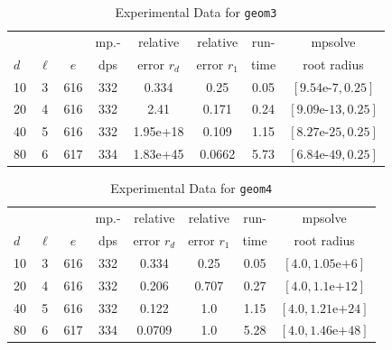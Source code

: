 \documentclass[runningheads]{llncs}
\begin{document}
\begin{table}
\caption{Experimental Data for \texttt{geom3}} %
\label{tab:geom3}
\vskip -0.15in
\begin{center}
\begin{small}
\begin{sc}
\begin{tabular}{lccccccc}
\toprule
&  &  & mp.-& relative  & relative & run- & mpsolve \\
$d$& $\ell$& $e$ & dps&error $r_d$       & error $r_1$ &time& root radius\\
\midrule
 10 & 3 & 616 & 332 & 0.334 & 0.25 & 0.05 & $[9.54\text{e-}7, 0.25]$\\
 20 & 4 & 616 & 332 & 2.41 & 0.171 & 0.24 & $[9.09\text{e-}13, 0.25]$\\
 40 & 5 & 616 & 332 & 1.95e+18 & 0.109 & 1.15 & $[8.27\text{e-}25, 0.25]$\\
 80 & 6 & 617 & 334 & 1.83e+45 & 0.0662 & 5.73 & $[6.84\text{e-}49, 0.25]$\\
\bottomrule
\end{tabular}
\end{sc}
\end{small}
\end{center}
\vskip 0.05in
\end{table}


\begin{table}
\caption{Experimental Data for \texttt{geom4}} %
\label{tab:geom4}
\vskip -0.15in
\begin{center}
\begin{small}
\begin{sc}
\begin{tabular}{lccccccc}
\toprule
&  &  & mp.-& relative  & relative & run- & mpsolve \\
$d$& $\ell$& $e$ & dps&error $r_d$       & error $r_1$ &time& root radius\\
\midrule
 10 & 3 & 616 & 332 & 0.334 & 0.25 & 0.05 & $[4.0, 1.05\text{e+}6]$\\
 20 & 4 & 616 & 332 & 0.206 & 0.707 & 0.27 & $[4.0, 1.1\text{e+}12]$\\
 40 & 5 & 616 & 332 & 0.122 & 1.0 & 1.15 & $[4.0, 1.21\text{e+}24]$\\
 80 & 6 & 617 & 334 & 0.0709 & 1.0 & 5.28 & $[4.0, 1.46\text{e+}48]$\\
\bottomrule
\end{tabular}
\end{sc}
\end{small}
\end{center}
\vskip 0.05in
\end{table}
\end{document}

